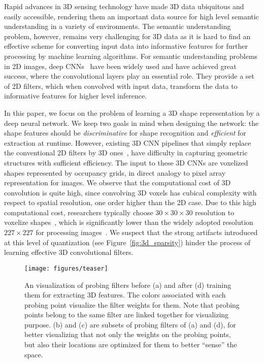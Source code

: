 \documentclass{article}
\begin{document}
Rapid advances in 3D sensing technology have made 3D data ubiquitous and easily accessible, rendering them an important data source for high level semantic understanding in a variety of environments. The semantic understanding problem, however, remains very challenging for 3D data as it is hard to find an effective scheme for converting input data into informative features for further processing by machine learning algorithms. For semantic understanding problems in 2D images, deep CNNs~\cite{Lecun_IEEE98_Gradient} have been widely used and have achieved great success, where the convolutional layers play an essential role. They provide a set of 2D filters, which when convolved with input data, transform the data to informative features for higher level inference.


In this paper, we focus on the problem of learning a 3D shape representation by a deep neural network. We keep two goals in mind when designing the network: the shape features should be \emph{discriminative} for shape recognition and \emph{efficient} for extraction at runtime. However, existing 3D CNN pipelines that simply replace the conventional 2D filters by 3D ones~\cite{WU_CVPR15_3D,Maturana_IROS15_VoxNet}, have difficulty in capturing geometric structures with sufficient efficiency. The input to these 3D CNNs are voxelized shapes represented by occupancy grids, in direct analogy to pixel array representation for images. We observe that the computational cost of 3D convolution is quite high, since convolving 3D voxels has cubical complexity with respect to spatial resolution, one order higher than the 2D case. Due to this high computational cost, researchers typically choose $30 \times 30 \times 30$ resolution to voxelize shapes~\cite{WU_CVPR15_3D,Maturana_IROS15_VoxNet}, which is significantly lower than the widely adopted resolution $227\times 227$ for processing images~\cite{Russakovsky_IJCV15_ImageNet}. We suspect that the strong artifacts introduced at this level of quantization (see Figure~\ref{fig:3d_sparsity}) hinder the process of learning effective 3D convolutional filters.

\begin{figure}[t!]
	\vspace{-0.5cm}
	\begin{center}
		\texttt{[image: figures/teaser]}
	\end{center}
	\vspace{-0.3cm}
	\caption{An visualization of probing filters before (a) and after (d) training them for extracting 3D features. The colors associated with each probing point visualize the filter weights for them. Note that probing points belong to the same filter are linked together for visualizing purpose. (b) and (c) are subsets of probing filters of (a) and (d), for better visualizing that not only the weights on the probing points, but also their locations are optimized for them to better ``sense'' the space.}
	\label{fig:teaser}
	\vspace{-0.6cm}
\end{figure}
\end{document}
